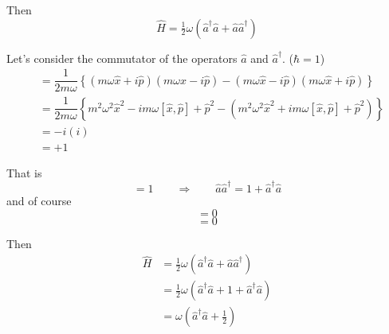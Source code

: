 \documentclass{article}
\begin{document}
\noindent Then
\begin{equation*}
\hat{H} = \tfrac{1}{2} \omega ( \hat{a}^\dagger \hat{a} + \hat{a} \hat{a}^\dagger )
\end{equation*}


\noindent Let's consider the commutator of the operators $\hat{a}$ and $\hat{a}^\dagger$. ($\hbar = 1$)
\begin{align*}
[ \hat{a}, \hat{a}^\dagger ] &= \dfrac{1}{2 m \omega} \left\lbrace ( m \omega \hat{x} + i \hat{p} ) ( m \omega \hat{x} - i \hat{p} ) - ( m \omega \hat{x} - i \hat{p} ) ( m \omega \hat{x} + i \hat{p} ) \right\rbrace \\
&= \dfrac{1}{2 m \omega} \left\lbrace m^2 \omega^2 \hat{x}^2 - i m \omega [ \hat{x}, \hat{p} ] + \hat{p}^2 - ( m^2 \omega^2 \hat{x}^2 + i m \omega [ \hat{x}, \hat{p} ] + \hat{p}^2 ) \right\rbrace \\
&= -i ( i ) \nonumber\\
&= +1
\end{align*}

\noindent That is
\begin{equation*}
[ \hat{a}, \hat{a}^\dagger ] = 1 \qquad \Rightarrow \qquad \hat{a} \hat{a}^\dagger = 1 + \hat{a}^\dagger \hat{a}
\end{equation*}
and of course
\begin{equation*}
[ \hat{a}, \hat{a} ] = 0
\end{equation*}
\begin{equation*}
[ \hat{a}^\dagger, \hat{a}^\dagger ] = 0
\end{equation*}

\noindent Then
\begin{align*}
\hat{H} &= \tfrac{1}{2} \omega ( \hat{a}^\dagger \hat{a} + \hat{a} \hat{a}^\dagger ) \\
&= \tfrac{1}{2} \omega ( \hat{a}^\dagger \hat{a} + 1 + \hat{a}^\dagger \hat{a} ) \\
&= \omega ( \hat{a}^\dagger \hat{a} + \tfrac{1}{2} )
\end{align*}

\end{document}
